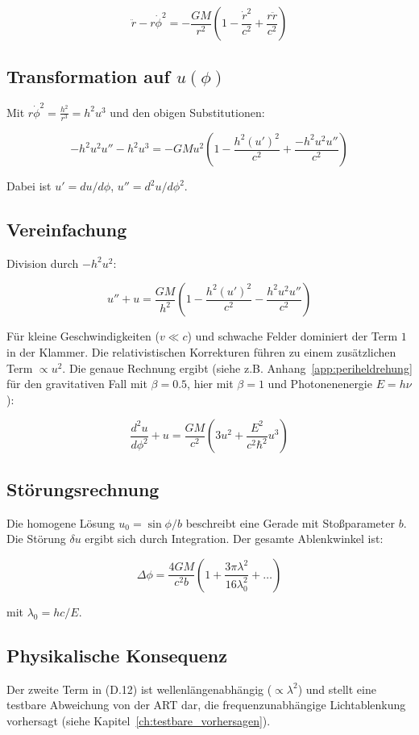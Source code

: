 \[
\ddot{r} - r\dot{\phi}^2 = -\frac{GM}{r^2} \left(1 - \frac{\dot{r}^2}{c^2} + \frac{r\ddot{r}}{c^2}\right)
\]

\subsection{Transformation auf \(u(\phi)\)}
\label{sub:herleitungen_licht_trans}

Mit \(r\dot{\phi}^2 = \frac{h^2}{r^3} = h^2 u^3\) und den obigen Substitutionen:

\[
-h^2 u^2 u'' - h^2 u^3 = -GM u^2 \left(1 - \frac{h^2 (u')^2}{c^2} + \frac{-h^2 u^2 u''}{c^2}\right)
\]

Dabei ist \(u' = du/d\phi\), \(u'' = d^2u/d\phi^2\).

\subsection{Vereinfachung}
\label{sub:herleitungen_licht_vereinf}

Division durch \(-h^2 u^2\):

\[
u'' + u = \frac{GM}{h^2} \left(1 - \frac{h^2 (u')^2}{c^2} - \frac{h^2 u^2 u''}{c^2}\right)
\]

Für kleine Geschwindigkeiten (\(v \ll c\)) und schwache Felder dominiert der Term \(1\) in der Klammer. Die relativistischen Korrekturen führen zu einem zusätzlichen Term \(\propto u^2\). Die genaue Rechnung ergibt (siehe z.B. Anhang~\ref{app:periheldrehung} für den gravitativen Fall mit \(\beta = 0.5\), hier mit \(\beta = 1\) und Photonenenergie \(E = h\nu\)):

\[
\frac{d^2u}{d\phi^2} + u = \frac{GM}{c^2} \left(3u^2 + \frac{E^2}{c^2 \hbar^2} u^3\right) \tag{D.11}
\]

\subsection{Störungsrechnung}
\label{sub:herleitungen_licht_stoerung}

Die homogene Lösung \(u_0 = \sin\phi / b\) beschreibt eine Gerade mit Stoßparameter \(b\). Die Störung \(\delta u\) ergibt sich durch Integration. Der gesamte Ablenkwinkel ist:

\[
\Delta\phi = \frac{4GM}{c^2 b} \left(1 + \frac{3\pi\lambda^2}{16\lambda_0^2} + \dots\right) \tag{D.12}
\]

mit \(\lambda_0 = hc / E\).

\subsection{Physikalische Konsequenz}
\label{sub:herleitungen_licht_konsequenz}

Der zweite Term in (D.12) ist wellenlängenabhängig (\(\propto \lambda^2\)) und stellt eine testbare Abweichung von der ART dar, die frequenzunabhängige Lichtablenkung vorhersagt (siehe Kapitel~\ref{ch:testbare_vorhersagen}).